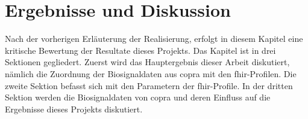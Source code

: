 \chapter{Ergebnisse und Diskussion} \label{ch:discussion}

 Nach der vorherigen Erläuterung der Realisierung, erfolgt in diesem Kapitel eine kritische Bewertung der Resultate dieses Projekts. Das Kapitel ist in drei Sektionen gegliedert. Zuerst wird das Hauptergebnis dieser Arbeit diskutiert, nämlich die Zuordnung der Biosignaldaten aus \ac{copra} mit den \ac{fhir}-Profilen. Die zweite Sektion befasst sich mit den Parametern der \ac{fhir}-Profile. In der dritten Sektion werden die Biosignaldaten von \ac{copra} und deren Einfluss auf die Ergebnisse dieses Projekts diskutiert.